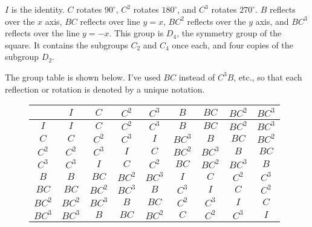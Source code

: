 \documentclass[../gatm.tex]{subfiles}
\begin{document}
\noindent $I$ is the identity. $C$ rotates $90^\circ$, $C^2$ rotates $180^\circ$, and $C^3$ rotates $270^\circ$. $B$ reflects over the $x$ axis, $BC$ reflects over line $y=x$, $BC^2$ reflects over the $y$ axis, and $BC^3$ reflects over the line $y=-x$. This group is $D_4$, the symmetry group of the square. It contains the subgroups $C_2$ and $C_4$ once each, and four copies of the subgroup $D_2$.

The group table is shown below. I've used $BC$ instead of $C^3B$, etc., so that each reflection or rotation is denoted by a unique notation.

\begin{figure}[h]
	\begin{center}
		\begin{minipage}[b]{\textwidth}
			\centering
			\begin{tabular}{c|cccccccc}
				\hline
				& $I$ & $C$ & $C^2$ & $C^3$ & $B$ & $BC$ & $BC^2$ & $BC^3$ \\ \hline
				\rowcolor{light-gray}
				$I$ & $I$ & $C$ & $C^2$ & $C^3$ & $B$ & $BC$ & $BC^2$ & $BC^3$ \\
				$C$ & $C$ & $C^2$ & $C^3$ & $I$ & $BC^3$ & $B$ & $BC$ & $BC^2$ \\
				\rowcolor{light-gray}
				$C^2$ & $C^2$ & $C^3$ & $I$ & $C$ & $BC^2$ & $BC^3$ & $B$ & $BC$ \\
				$C^3$ & $C^3$ & $I$ & $C$ & $C^2$ & $BC$ & $BC^2$ & $BC^3$ & $B$ \\
				\rowcolor{light-gray}
				$B$ & $B$ & $BC$ & $BC^2$ & $BC^3$ & $I$ & $C$ & $C^2$ & $C^3$ \\
				$BC$ & $BC$ & $BC^2$ & $BC^3$ & $B$ & $C^3$ & $I$ & $C$ & $C^2$ \\
				\rowcolor{light-gray}
				$BC^2$ & $BC^2$ & $BC^3$ & $B$ & $BC$ & $C^2$ & $C^3$ & $I$ & $C$ \\
				$BC^3$ & $BC^3$ & $B$ & $BC$ & $BC^2$ & $C$ & $C^2$ & $C^3$ & $I$ \\ \hline
			\end{tabular}
			\vspace*{0.5\baselineskip}
		\end{minipage}
	\end{center}
\end{figure}
\end{document}
